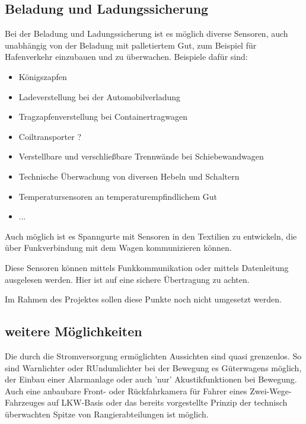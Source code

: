 \subsection{Beladung und Ladungssicherung}
Bei der Beladung und Ladungssicherung ist es möglich diverse Sensoren, auch unabhängig von der Beladung mit palletiertem Gut, zum Beispiel für Hafenverkehr einzubauen und zu überwachen. Beispiele dafür sind:
\begin{itemize}
    \item Königszapfen
    \item Ladeverstellung bei der Automobilverladung
    \item Tragzapfenverstellung bei Containertragwagen
    \item Coiltransporter ?
    \item Verstellbare und verschließbare Trennwände bei Schiebewandwagen
    \item Technische Überwachung von diversen Hebeln und Schaltern
    \item Temperatursensoren an temperaturempfindlichem Gut
    \item ...
\end{itemize}
Auch möglich ist es Spanngurte mit Sensoren in den Textilien zu entwickeln, die über Funkverbindung mit dem Wagen kommunizieren können.\par
Diese Sensoren können mittels Funkkommunikation oder mittels Datenleitung ausgelesen werden. Hier ist auf eine sichere Übertragung zu achten.\par
Im Rahmen des Projektes sollen diese Punkte noch nicht umgesetzt werden.

\subsection{weitere Möglichkeiten}
Die durch die Stromversorgung ermöglichten Aussichten sind quasi grenzenlos. So sind Warnlichter oder RUndumlichter bei der Bewegung es Güterwagens möglich, der Einbau einer Alarmanlage oder auch 'nur' Akustikfunktionen bei Bewegung. Auch eine anbaubare Front- oder Rückfahrkamera für Fahrer eines Zwei-Wege-Fahrzeuges auf LKW-Basis oder das bereits vorgestellte Prinzip der technisch überwachten Spitze von Rangierabteilungen\cite{RTUS} ist möglich.

